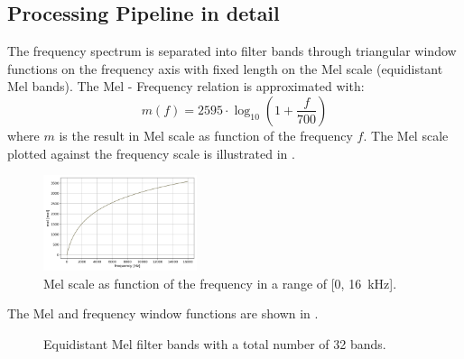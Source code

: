 \subsection{Processing Pipeline in detail}
The frequency spectrum is separated into filter bands through triangular window functions on the frequency axis with fixed length on the Mel scale (equidistant Mel bands).
The Mel - Frequency relation is approximated with:
\begin{equation}\label{eq:signal_mfcc_mel}
  m(f) = 2595 \cdot \log_{10} \left(1 + \frac{f}{700} \right) 
\end{equation}
where $m$ is the result in Mel scale as function of the frequency $f$.
The Mel scale plotted against the frequency scale is illustrated in .
\begin{figure}[!ht]
  \centering
  \includegraphics[width=0.40\textwidth]{./3_signal/figs/signal_mfcc_mel_scale}
  \caption{Mel scale as function of the frequency in a range of [0, \SI{16}{\kilo\hertz}].}
  \label{fig:signal_mfcc_mel_scale}
\end{figure}
\FloatBarrier
\noindent
The Mel and frequency window functions are shown in .
\begin{figure}[!ht]
  \centering
  \quad
  \caption{Equidistant Mel filter bands with a total number of 32 bands.}
  \label{fig:filter_bands}
\end{figure}
